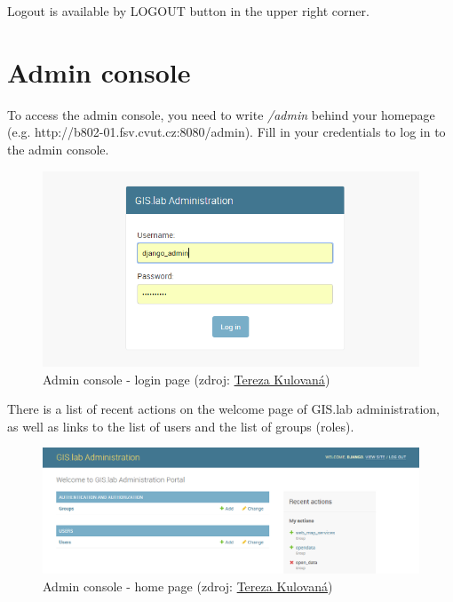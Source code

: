 Logout is available by \textsf{LOGOUT} button in the upper right corner.

\section{Admin console}
\label{admin-console}

To access the admin console, you need to write \textit{/admin} behind your homepage  (e.g. http://b802-01.fsv.cvut.cz:8080/admin). Fill in your credentials to log in to the admin console.
\begin{figure}[H] \centering
    \includegraphics[width=430pt]{./prilohy/guide-admin-home-unknown.png}
    \caption[Admin console - login page]{Admin console - login page (zdroj:
	\href{}{Tereza Kulovaná})}
	\label{fig:guide-admin-home-unknown}
\end{figure}

There is a list of recent actions on the welcome page of GIS.lab administration, as well as links to the list of users and the list of groups (roles). 
\begin{figure}[H] \centering
    \includegraphics[width=430pt]{./prilohy/guide-admin-home-known.png}
    \caption[Admin console - home page]{Admin console - home page (zdroj:
	\href{}{Tereza Kulovaná})}
	\label{fig:guide-admin-home-known}
\end{figure}

